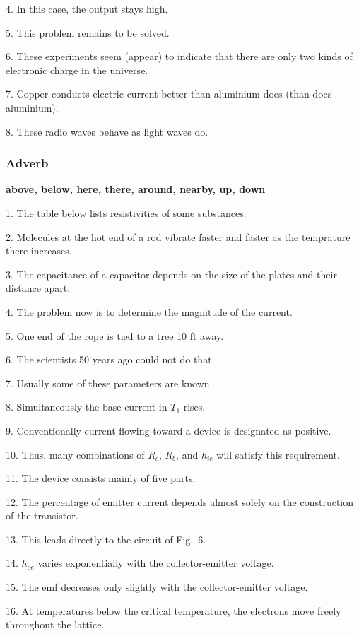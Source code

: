 \documentclass[a4paper,twocolumn,10pt]{article}
\begin{document}
\begin{CJK}{UTF8}{gkai}
	4. In this case, the output stays high.

	5. This problem remains to be solved.

	6. These experiments seem (appear) to indicate that there are only two kinds of
	electronic charge in the universe.

	7. Copper conducts electric current better than aluminium does (than does aluminium).

	8. These radio waves behave as light waves do.

	\subsubsection{Adverb}

	{\bf above, below, here, there, around, nearby, up, down}

	1. The table below lists resistivities of some substances.

	2. Molecules at the hot end of a rod vibrate faster and faster as the temprature there
	increases.

	3. The capacitance of a capacitor depends on the size of the plates and their distance apart.

	4. The problem now is to determine the magnitude of the current.

	5. One end of the rope is tied to a tree 10 ft away.

	6. The scientists 50 years ago could not do that.

	7. Usually some of these parameters are known.

	8. Simultaneously the base current in $T_1$ rises.

	9. Conventionally current flowing toward a device is designated 
	as positive.

	10. Thus, many combinations of $R_c$, $R_b$, and $h_{ie}$ will satisfy this requirement.

	11. The device consists mainly of five parts.

	12. The percentage of emitter current depends almost solely on the construction of
	the transistor.

	13. This leads directly to the circuit of Fig.~6.

	14. $h_{oe}$ varies exponentially with the collector-emitter voltage.

	15. The emf decreases only slightly with the collector-emitter voltage.

	16. At temperatures below the critical temperature, the electrons move freely throughout
	the lattice.


\end{CJK}
\end{document}

